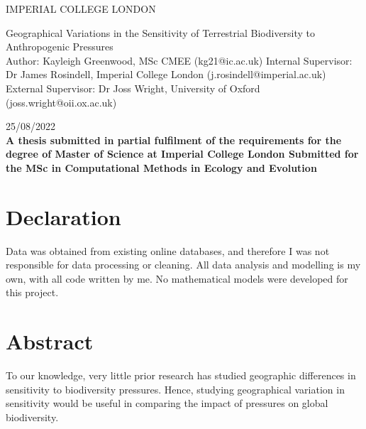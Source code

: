\documentclass[11pt, a4paper, titlepage]{article}
\begin{document}
    \begin{titlepage}
    \begin{center}
            {\large IMPERIAL COLLEGE LONDON}
    \end{center}
    
    \vspace*{\fill}
    
    \begin{center}
        {\Huge 
    	 Geographical Variations in the Sensitivity of Terrestrial Biodiversity to Anthropogenic Pressures}
        \\[2in]
        Author: Kayleigh Greenwood, MSc CMEE (kg21@ic.ac.uk)
        \bigskip
        \newline
       Internal Supervisor: Dr James Rosindell, Imperial College London (j.rosindell@imperial.ac.uk)
       \bigskip
       \newline
        External Supervisor: Dr Joss Wright, University of Oxford (joss.wright@oii.ox.ac.uk)
        \bigskip
        \newline

        25/08/2022
        \\[2in]
        
        {\bfseries A thesis submitted in partial fulfilment of the requirements for the degree of Master of Science at Imperial College London \newline \newline Submitted for the MSc in Computational Methods in Ecology and Evolution }

        

    
	\end{center}
    \vspace{\fill}
    
    \end{titlepage}
	\section*{Declaration}
	\begin{center}
	Data was obtained from existing online databases, and therefore I was not responsible for data processing or cleaning. All data analysis and modelling is my own, with all code written by me. No mathematical models were developed for this project.
	\end{center}
	\newpage
	
	\section*{Abstract}
	 To our knowledge, very little prior research has studied geographic differences in sensitivity to biodiversity pressures. Hence, studying geographical variation in  sensitivity would be useful in comparing the impact of pressures on global biodiversity.
	
\end{document}
